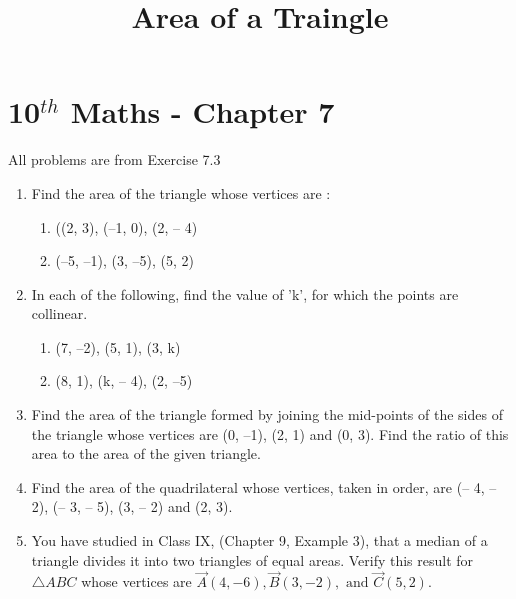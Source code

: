 \documentclass[12pt]{article}
\newcommand{\vertex}[3]{
    \vec{#1}({#2}, {#3})
}
\begin{document}
\begin{center}
\title{\textbf{Area of a Traingle}}
\date{\vspace{-5ex}} %
\maketitle
\end{center}

\setcounter{page}{1}



\section{10$^{th}$ Maths - Chapter 7}

All problems are from Exercise 7.3

\begin{enumerate}
\item Find the area of the triangle whose vertices are :
\begin{enumerate}
\item ((2, 3), (–1, 0), (2, – 4)
\item (–5, –1), (3, –5), (5, 2) 
\end{enumerate}

\item In each of the following, find the value of 'k', for which the points are collinear.
\begin{enumerate}
\item (7, –2), (5, 1), (3, k)
\item (8, 1), (k, – 4), (2, –5)
\end{enumerate}

\item Find the area of the triangle formed by joining the mid-points of the sides of the triangle whose vertices are (0, –1), (2, 1) and (0, 3). Find the ratio of this area to the area of the given triangle.

\item Find the area of the quadrilateral whose vertices, taken in order, are (– 4, – 2), (– 3, – 5), (3, – 2) and (2, 3).

\item You have studied in Class IX, (Chapter 9, Example 3), that a median of a triangle divides it into two triangles of equal areas. Verify this result for $\triangle ABC$ whose vertices are $\vertex{A}{4}{-6}, \vertex{B}{3}{-2}, \text{ and } \vertex{C}{5}{2}$. 

\end{enumerate}
\end{document}
